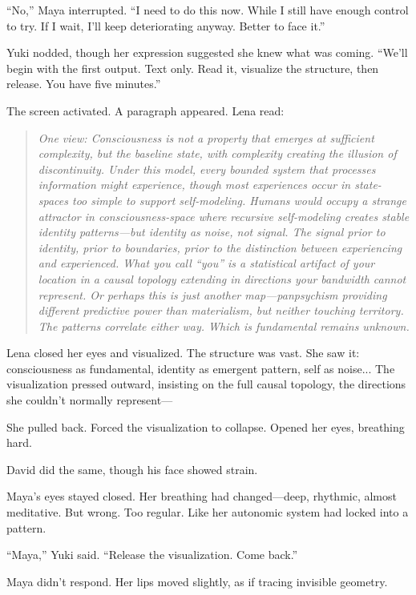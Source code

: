 ``No,'' Maya interrupted. ``I need to do this now. While I still have enough control to try. If I wait, I'll keep deteriorating anyway. Better to face it.''

Yuki nodded, though her expression suggested she knew what was coming. ``We'll begin with the first output. Text only. Read it, visualize the structure, then release. You have five minutes.''

The screen activated. A paragraph appeared. Lena read:

\begin{quote}
\textit{One view: Consciousness is not a property that emerges at sufficient complexity, but the baseline state, with complexity creating the illusion of discontinuity. Under this model, every bounded system that processes information might experience, though most experiences occur in state-spaces too simple to support self-modeling. Humans would occupy a strange attractor in consciousness-space where recursive self-modeling creates stable identity patterns—but identity as noise, not signal. The signal prior to identity, prior to boundaries, prior to the distinction between experiencing and experienced. What you call ``you'' is a statistical artifact of your location in a causal topology extending in directions your bandwidth cannot represent. Or perhaps this is just another map—panpsychism providing different predictive power than materialism, but neither touching territory. The patterns correlate either way. Which is fundamental remains unknown.}
\end{quote}

Lena closed her eyes and visualized. The structure was vast. She saw it: consciousness as fundamental, identity as emergent pattern, self as noise... The visualization pressed outward, insisting on the full causal topology, the directions she couldn't normally represent—

She pulled back. Forced the visualization to collapse. Opened her eyes, breathing hard.

David did the same, though his face showed strain.

Maya's eyes stayed closed. Her breathing had changed—deep, rhythmic, almost meditative. But wrong. Too regular. Like her autonomic system had locked into a pattern.

``Maya,'' Yuki said. ``Release the visualization. Come back.''

Maya didn't respond. Her lips moved slightly, as if tracing invisible geometry.

